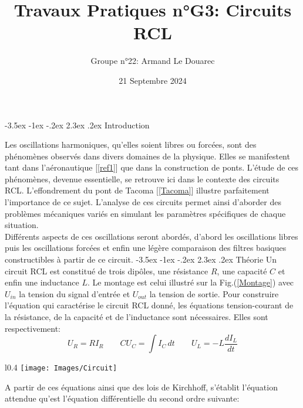 \documentclass[a4paper, 12pt,oneside]{article}
\title{Travaux Pratiques n°G3: Circuits RCL}
\author{Groupe n°22: Armand Le Douarec}
\date{21 Septembre 2024}
\makeatletter
\renewcommand{\section}{\@startsection {section}{1}{\z@}%
             {-3.5ex \@plus -1ex \@minus -.2ex}%
             {2.3ex \@plus.2ex}%
             {\normalfont\normalsize\bfseries}}
\makeatother
\begin{document}
\maketitle

\section{Introduction}

Les oscillations harmoniques, qu'elles soient libres ou forcées, sont des phénomènes observés dans divers domaines de la physique. Elles se manifestent tant dans l'aéronautique [\ref{ref1}] que dans la construction de ponts. L'étude de ces phénomènes, devenue essentielle, se retrouve ici dans le contexte des circuits RCL. L'effondrement du pont de Tacoma [\ref{Tacoma}] illustre parfaitement l'importance de ce sujet. L'analyse de ces circuits permet ainsi d'aborder des problèmes mécaniques variés en simulant les paramètres spécifiques de chaque situation.\\
Différents aspects de ces oscillations seront abordés, d'abord les oscillations libres puis les oscillations forcées et enfin une légère comparaison des filtres basiques constructibles à partir de ce circuit.
\section{Théorie}
Un circuit RCL est constitué de trois dipôles, une résistance $R$, une capacité $C$ et enfin une inductance $L$. Le montage est celui illustré sur la Fig.(\ref{Montage}) avec $U_{in}$ la tension du signal d'entrée et $U_{out}$ la tension de sortie. Pour construire l'équation qui caractérise le circuit RCL donné, les équations tension-courant de la résistance, de la capacité et de l'inductance sont nécessaires. Elles sont respectivement:
\begin{equation}
    U_R=RI_R\qquad CU_C=\int I_C \,dt \qquad U_L=-L\frac{dI_L}{dt}
\end{equation}

\begin{wrapfigure}{l}{0.4\textwidth}
\vspace{-1.1cm}
\texttt{[image: Images/Circuit]}
\captionsetup{justification=centering}
\caption{Représentation du circuit RCL étudié}
\label{fig:wrapfig}
\label{Montage}
\end{wrapfigure}

 A partir de ces équations ainsi que des lois de Kirchhoff, s'établit l'équation attendue qu'est l'équation différentielle du second ordre suivante:
\end{document}
